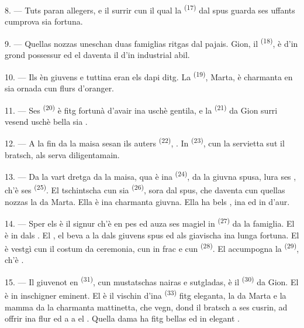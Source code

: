 \VUsaut{3.0mm}

8. --- Tuts paran allegers, e il surrir cun il qual la 
\textsuperscript{(17)} dal spus guarda ses uffants cumprova sia fortuna.

9. --- Quellas nozzas uneschan duas famiglias ritgas dal pajais. Gion, il
 \textsuperscript{(18)}, è  d'in grond possessur ed el daventa
il  d'in industrial abil.

10. --- Ils  èn giuvens e tuttina eran els  dapi ditg.
La  \textsuperscript{(19)}, Marta, è charmanta en sia
 ornada cun flurs d'oranger.

11. --- Ses  \textsuperscript{(20)} è fitg fortunà d'avair ina
 uschè gentila, e la  \textsuperscript{(21)} da Gion
surri vesend uschè bella sia .

12. --- A la fin da la maisa sesan ils auters 
\textsuperscript{(22)}, . In
 \textsuperscript{(23)}, cun la servietta sut il bratsch,
als serva diligentamain.

\VUsaut{3.0mm}

13. --- Da la vart dretga da la maisa, qua è ina 
\textsuperscript{(24)},  da la giuvna spusa, lura ses , ch'è
ses  \textsuperscript{(25)}. El tschintscha cun sia
 \textsuperscript{(26)}, sora dal spus, che daventa cun
quellas nozzas la  da Marta. Ella è ina charmanta giuvna. Ella ha
bels , ina  ed in 
d'aur.

14. --- Sper els è il signur ch'è en pes ed auza ses magiel in 
\textsuperscript{(27)} da la famiglia. El è in dals . El
, el beva a la  dals giuvens spus ed als
giavischa ina lunga fortuna. El è vestgì cun il costum da ceremonia, cun in frac e
cun  \textsuperscript{(28)}. El accumpogna la 
\textsuperscript{(29)}, ch'è .

15. --- Il giuvenot en  \textsuperscript{(31)}, cun mustatschas nairas e
sutgladas, è il  \textsuperscript{(30)} da Gion. El è in inschigner
eminent. El è il vischin d'ina  \textsuperscript{(33)} fitg
eleganta, la  da Marta e la mamma da la charmanta
mattinetta, che vegn, dond il bratsch a ses cusrin, ad offrir ina flur ed a
 a el . Quella dama ha fitg bellas
 ed in elegant .

